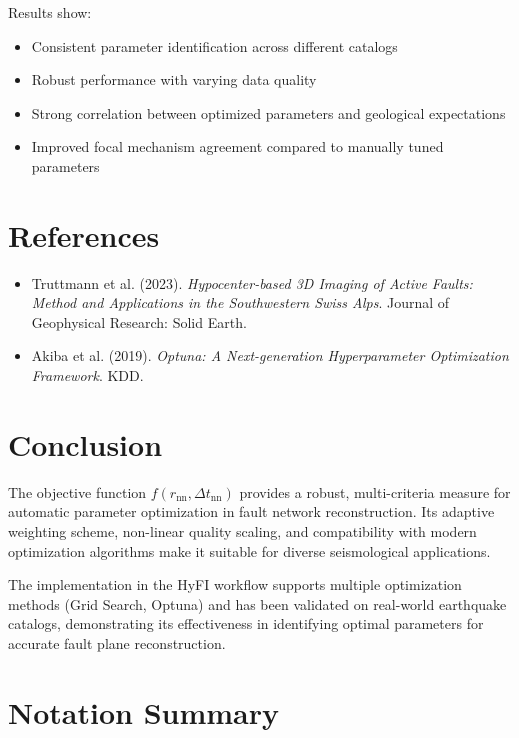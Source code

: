 \documentclass[11pt,a4paper]{article}
\begin{document}
Results show:
\begin{itemize}
    \item Consistent parameter identification across different catalogs
    \item Robust performance with varying data quality
    \item Strong correlation between optimized parameters and geological expectations
    \item Improved focal mechanism agreement compared to manually tuned parameters
\end{itemize}

\section{References}

\begin{itemize}
    \item Truttmann et al. (2023). \textit{Hypocenter-based 3D Imaging of Active Faults: Method and Applications in the Southwestern Swiss Alps}. Journal of Geophysical Research: Solid Earth.
    \item Akiba et al. (2019). \textit{Optuna: A Next-generation Hyperparameter Optimization Framework}. KDD.
\end{itemize}

\section{Conclusion}

The objective function $f(r_{\text{nn}}, \Delta t_{\text{nn}})$ provides a robust, multi-criteria measure for automatic parameter optimization in fault network reconstruction. Its adaptive weighting scheme, non-linear quality scaling, and compatibility with modern optimization algorithms make it suitable for diverse seismological applications.

The implementation in the HyFI workflow supports multiple optimization methods (Grid Search, Optuna) and has been validated on real-world earthquake catalogs, demonstrating its effectiveness in identifying optimal parameters for accurate fault plane reconstruction.

\appendix

\section{Notation Summary}
\end{document}
